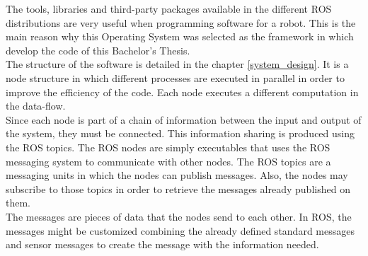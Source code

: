 	The tools, libraries and third-party packages available in the different ROS distributions are very useful when programming software for a robot. This is the main reason why this Operating System was selected as the framework in which develop the code of this Bachelor's Thesis. 
	\\
	The structure of the software is detailed in the chapter \ref{system_design}.  It is a node structure in which different processes are executed in parallel in order to improve the efficiency of the code. Each node executes a different computation in the data-flow. 
	\\
	Since each node is part of a chain of information between the input and output of the system, they must be connected. This information sharing is produced using the ROS topics. 
	The ROS nodes are simply executables that uses the ROS messaging system to communicate with other nodes. The ROS topics are a messaging units in which the nodes can publish messages. Also, the nodes may subscribe to those topics in order to retrieve the messages already published on them. 
	\\
	The messages are pieces of data that the nodes send to each other. In ROS, the messages might be customized combining the already defined standard messages and sensor messages to create the message with the information needed. 







